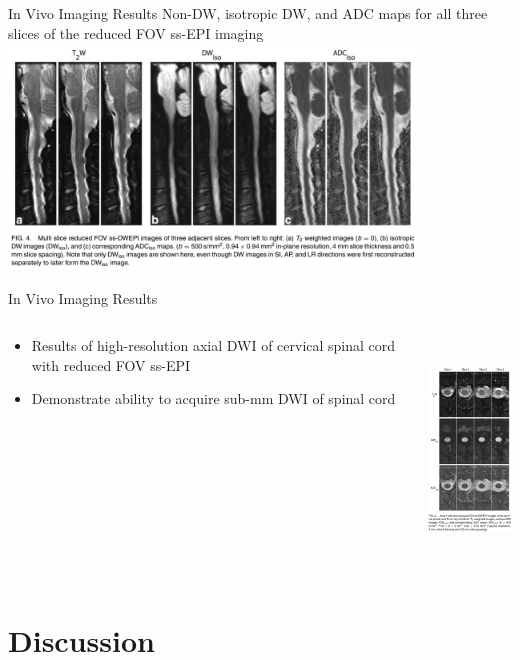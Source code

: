 \documentclass{beamer}
\begin{document}
\begin{frame}{In Vivo Imaging Results}
	Non-DW, isotropic DW, and ADC maps for all three slices of the reduced FOV ss-EPI imaging
	\includegraphics[height=6cm]{SpineDWIfig4}
\end{frame}

\begin{frame}{In Vivo Imaging Results}
\begin{columns}[T]
	\begin{column}[T]{5cm}
		\begin{itemize}
			\item Results of high-resolution axial DWI of cervical spinal cord with reduced FOV ss-EPI
			\item Demonstrate ability to acquire sub-mm DWI of spinal cord
		\end{itemize}
	\end{column}
	\begin{column}[T]{5cm}
		\includegraphics[height=6cm]{SpineDWIfig5}
	\end{column}
\end{columns}
\end{frame}

\section{Discussion}
\end{document}
